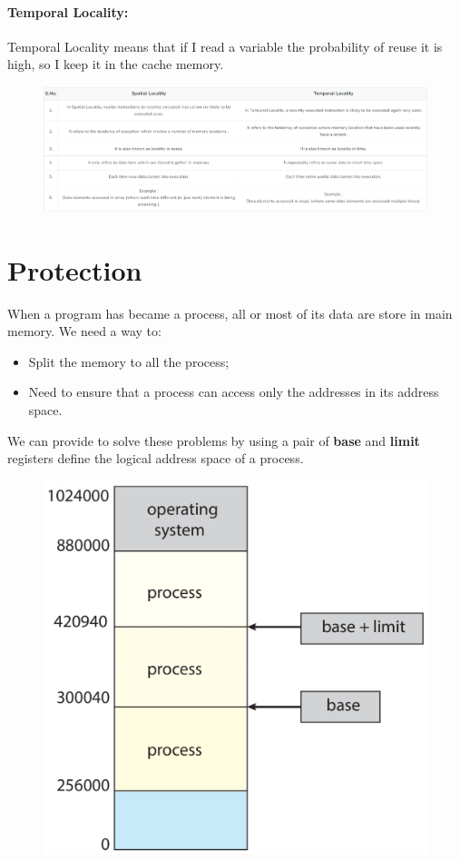 \paragraph{Temporal Locality:} Temporal Locality means that if I read a variable the probability of reuse it is high, so I keep it in the cache memory.


\begin{figure}[htbp]
    \centering
    \includegraphics[width=1\linewidth]{img/spatial.png}
\end{figure}


\section{Protection}

When a program has became a process, all or most of its data are store in main memory. We need a way to:

\begin{itemize}
    \item Split the memory to all the process;
    \item Need to ensure that a process can access only the addresses in its address space.
\end{itemize}

We can provide to solve these problems by using a pair of \textbf{base} and \textbf{limit} registers define the logical address space of a process.


\begin{figure}[htbp]
    \centering
    \includegraphics[width=0.4\linewidth]{img/adsfcv.png}
\end{figure}

